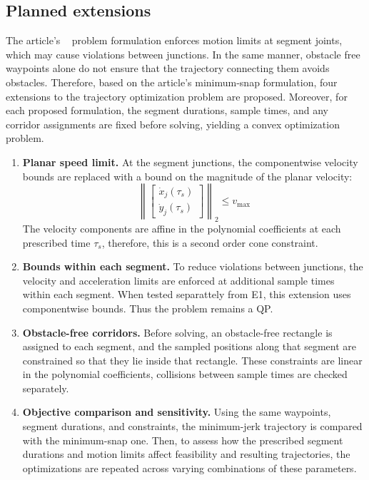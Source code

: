\subsection{Planned extensions}
The article's ~\cite{luo2024otpwr} problem formulation enforces motion limits at segment joints, which may cause violations between junctions. In the same manner, obstacle free waypoints alone do not ensure that the trajectory connecting them avoids obstacles. Therefore, based on the article's minimum-snap formulation,  four extensions to the trajectory optimization problem are proposed. Moreover, for each proposed formulation, the segment durations, sample times, and any corridor assignments are fixed before solving, yielding a convex optimization problem.

\begin{enumerate}
    \item [\textbf{E1.}] \textbf{Planar speed limit.}
    At the segment junctions, the componentwise velocity bounds are replaced with a bound on the magnitude of the planar velocity:
    \[
    \left\lVert
    \begin{bmatrix}
        \dot{x}_j(\tau_s)\\
        \dot{y}_j(\tau_s)
        \end{bmatrix}
        \right\rVert_2\leq v_{\max}
    \]
    The velocity components are affine in the polynomial coefficients at each prescribed time $\tau_s$, therefore, this is a second order cone constraint.

    \item[\textbf{E2.}] \textbf{Bounds within each segment.}
    To reduce violations between junctions, the velocity and acceleration limits are enforced at additional sample times within each segment. When tested separattely from E1, this extension uses componentwise bounds. Thus the problem remains a QP.

    \item[\textbf{E3.}] \textbf{Obstacle-free corridors.}
    Before solving, an obstacle-free rectangle is assigned to each segment, and the sampled positions along that segment are constrained so that they lie inside that rectangle. These constraints are linear in the polynomial coefficients, collisions between sample times are checked separately.

    \item[\textbf{E4.}] \textbf{Objective comparison and sensitivity.}
    Using the same waypoints, segment durations, and constraints, the minimum-jerk trajectory is compared with the minimum-snap one. Then, to assess how the prescribed segment durations and motion limits affect feasibility and resulting trajectories, the optimizations are repeated across varying combinations of these parameters.
\end{enumerate}